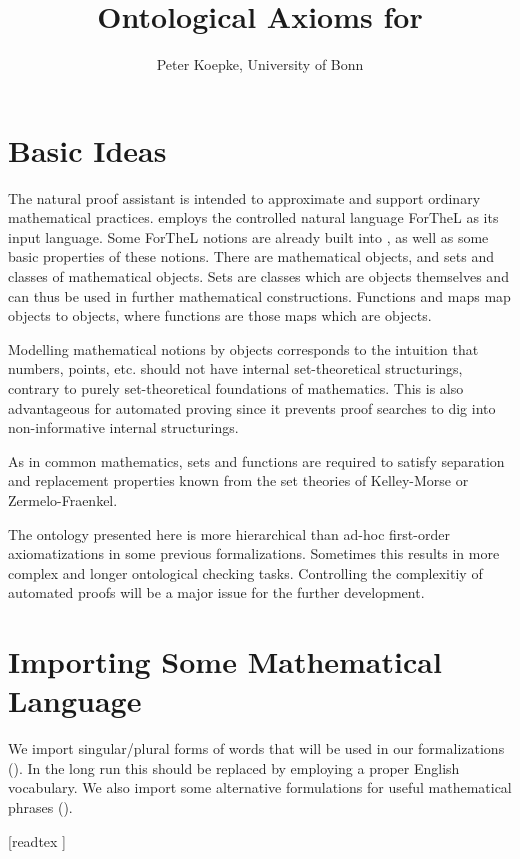 \documentclass[11pt]{article}
\author{Peter Koepke, University of Bonn}
\title{Ontological Axioms for \Naproche}
\begin{document}
\maketitle

\section{Basic Ideas}

The natural proof assistant \Naproche is intended to
approximate and support ordinary mathematical practices.
\Naproche employs the controlled natural language ForTheL
as its input language. Some ForTheL notions are already
built into \Naproche, as well as some basic properties of
these notions.
There are
mathematical objects, and sets and classes of mathematical
objects. Sets are classes which are objects themselves and
can thus be used in further mathematical constructions. Functions
and maps map objects to objects, where functions are those
maps which are objects.

Modelling mathematical notions by objects corresponds
to the intuition that numbers, points, etc. should
not have internal set-theoretical
structurings, contrary to purely set-theoretical
foundations of mathematics. This is also advantageous
for automated proving since it prevents proof searches to
dig into non-informative internal structurings.

As in common mathematics, sets and functions are required to
satisfy separation and replacement properties known from the
set theories of Kelley-Morse or Zermelo-Fraenkel.

The ontology presented here is more hierarchical than
ad-hoc first-order axiomatizations in some previous
\Naproche formalizations. Sometimes
this results in more complex and longer ontological checking tasks.
Controlling the complexitiy of automated proofs will be a major
issue for the further development.

\section{Importing Some Mathematical Language}
We import singular/plural forms of words that will be used in
our formalizations ().
In the long run this should be replaced by
employing a proper English vocabulary. We also
import some alternative formulations for
useful mathematical phrases ().
\begin{forthel}

[readtex ]
\end{forthel}
\end{document}
